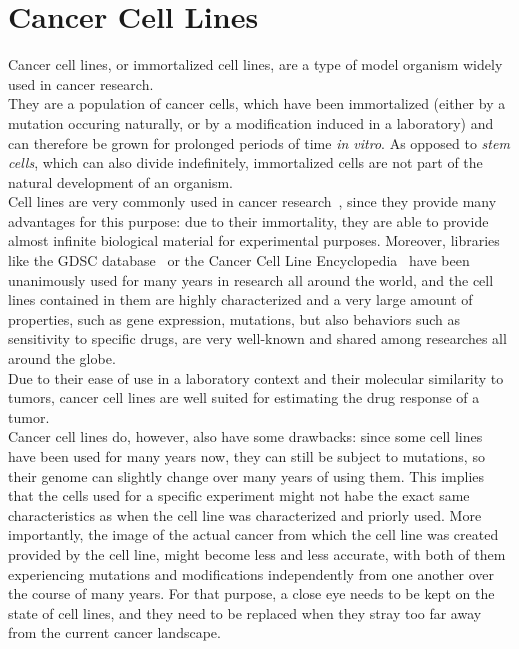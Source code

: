 \section{Cancer Cell Lines}\label{sec:cancer_cell_lines}
Cancer cell lines, or immortalized cell lines, are a type of model organism widely used in cancer research.\\
They are a population of cancer cells, which have been immortalized (either by a mutation occuring naturally, or by a modification induced in a laboratory) and can therefore be grown for prolonged periods of time \textit{in vitro}. As opposed to \textit{stem cells}, which can also divide indefinitely, immortalized cells are not part of the natural development of an organism.\\
Cell lines are very commonly used in cancer research~\cite{cancer_cell_lines_useful_model}, since they provide many advantages for this purpose: due to their immortality, they are able to provide almost infinite biological material for experimental purposes. Moreover, libraries like the GDSC database~\cite{gdsc} or the Cancer Cell Line Encyclopedia~\cite{ccle} have been unanimously used for many years in research all around the world, and the cell lines contained in them are highly characterized and a very large amount of properties, such as gene expression, mutations, but also behaviors such as sensitivity to specific drugs, are very well-known and shared among researches all around the globe.\\
Due to their ease of use in a laboratory context and their molecular similarity to tumors, cancer cell lines are well suited for estimating the drug response of a tumor.\\
Cancer cell lines do, however, also have some drawbacks: since some cell lines have been used for many years now, they can still be subject to mutations, so their genome can slightly change over many years of using them. This implies that the cells used for a specific experiment might not habe the exact same characteristics as when the cell line was characterized and priorly used. More importantly, the image of the actual cancer from which the cell line was created provided by the cell line, might become less and less accurate, with both of them experiencing mutations and modifications independently from one another over the course of many years. For that purpose, a close eye needs to be kept on the state of cell lines, and they need to be replaced when they stray too far away from the current cancer landscape.\\

